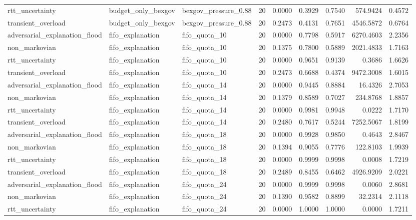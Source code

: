 \begin{table}[t]
\begin{tabular}{lllrrrrrr}
rtt\_uncertainty & budget\_only\_bexgov & bexgov\_pressure\_0.88 & 20 & 0.0000 & 0.3929 & 0.7540 & 574.9424 & 0.4572 \\
transient\_overload & budget\_only\_bexgov & bexgov\_pressure\_0.88 & 20 & 0.2473 & 0.4131 & 0.7651 & 4546.5872 & 0.6764 \\
adversarial\_explanation\_flood & fifo\_explanation & fifo\_quota\_10 & 20 & 0.0000 & 0.7798 & 0.5917 & 6270.4603 & 2.2356 \\
non\_markovian & fifo\_explanation & fifo\_quota\_10 & 20 & 0.1375 & 0.7800 & 0.5889 & 2021.4833 & 1.7163 \\
rtt\_uncertainty & fifo\_explanation & fifo\_quota\_10 & 20 & 0.0000 & 0.9651 & 0.9139 & 0.3686 & 1.6626 \\
transient\_overload & fifo\_explanation & fifo\_quota\_10 & 20 & 0.2473 & 0.6688 & 0.4374 & 9472.3008 & 1.6015 \\
adversarial\_explanation\_flood & fifo\_explanation & fifo\_quota\_14 & 20 & 0.0000 & 0.9445 & 0.8884 & 16.4326 & 2.7053 \\
non\_markovian & fifo\_explanation & fifo\_quota\_14 & 20 & 0.1379 & 0.8589 & 0.7027 & 234.8768 & 1.8857 \\
rtt\_uncertainty & fifo\_explanation & fifo\_quota\_14 & 20 & 0.0000 & 0.9981 & 0.9948 & 0.0222 & 1.7170 \\
transient\_overload & fifo\_explanation & fifo\_quota\_14 & 20 & 0.2480 & 0.7617 & 0.5244 & 7252.5067 & 1.8199 \\
adversarial\_explanation\_flood & fifo\_explanation & fifo\_quota\_18 & 20 & 0.0000 & 0.9928 & 0.9850 & 0.4643 & 2.8467 \\
non\_markovian & fifo\_explanation & fifo\_quota\_18 & 20 & 0.1394 & 0.9055 & 0.7776 & 122.8103 & 1.9939 \\
rtt\_uncertainty & fifo\_explanation & fifo\_quota\_18 & 20 & 0.0000 & 0.9999 & 0.9998 & 0.0008 & 1.7219 \\
transient\_overload & fifo\_explanation & fifo\_quota\_18 & 20 & 0.2489 & 0.8455 & 0.6462 & 4926.9209 & 2.0221 \\
adversarial\_explanation\_flood & fifo\_explanation & fifo\_quota\_24 & 20 & 0.0000 & 0.9999 & 0.9998 & 0.0060 & 2.8681 \\
non\_markovian & fifo\_explanation & fifo\_quota\_24 & 20 & 0.1390 & 0.9582 & 0.8899 & 32.2314 & 2.1118 \\
rtt\_uncertainty & fifo\_explanation & fifo\_quota\_24 & 20 & 0.0000 & 1.0000 & 1.0000 & 0.0000 & 1.7211 \\

\end{tabular}
\end{table}

